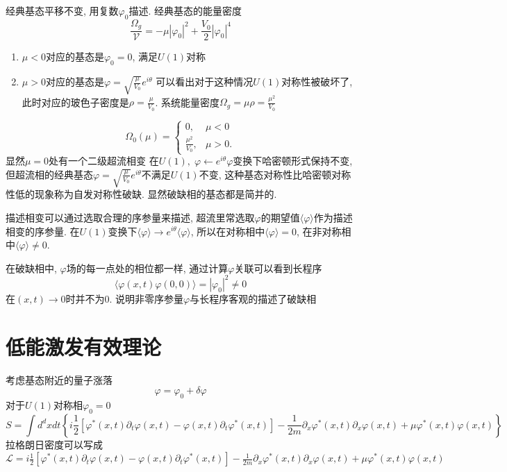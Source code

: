 \documentclass[a4paper,11pt]{article}
\begin{document}
经典基态平移不变, 用复数$\varphi_0$描述. 经典基态的能量密度
\begin{equation*}
  \frac{\Omega_g}{\mathcal{V}}=-\mu|\varphi_0|^2+\frac{V_0}{2}|\varphi_0|^4
\end{equation*}
\begin{enumerate}
  \item $\mu<0$对应的基态是$\varphi_0=0$, 满足$U(1)$对称
  \item $\mu>0$对应的基态是$\varphi=\sqrt{\frac{\mu}{V_0}}e^{i\theta}$
  可以看出对于这种情况$U(1)$对称性被破坏了, 此时对应的玻色子密度是$\rho=\frac{\mu}{V_0}$. 系统能量密度$\Omega_g=\mu\rho=\frac{\mu^2}{V_0}$
\end{enumerate}
\begin{equation*}
  \Omega_0(\mu)=\begin{cases}
                  0, & \mu<0 \\
                  \frac{\mu^2}{V_0}, & \mu>0.
                \end{cases}
\end{equation*}
显然$\mu=0$处有一个二级超流相变
在$U(1),\;\varphi\leftarrow e^{i\theta}\varphi$变换下哈密顿形式保持不变, 但超流相的经典基态$\varphi=\sqrt{\frac{\mu}{V_0}}e^{i\theta}$不满足$U(1)$不变, 这种基态对称性比哈密顿对称性低的现象称为自发对称性破缺. 显然破缺相的基态都是简并的.

描述相变可以通过选取合理的序参量来描述, 超流里常选取$\varphi$的期望值$\langle\varphi\rangle$作为描述相变的序参量. 在$U(1)$变换下$\langle\varphi\rangle\rightarrow e^{i\theta}\langle\varphi\rangle$, 所以在对称相中$\langle\varphi\rangle=0$, 在非对称相中$\langle\varphi\rangle\neq0$.

在破缺相中, $\varphi$场的每一点处的相位都一样, 通过计算$\varphi$关联可以看到长程序
\begin{equation*}
  \langle\varphi(x,t)\varphi(0,0)\rangle=|\varphi_0|^2\neq0
\end{equation*}
在$(x,t)\to0$时并不为$0$. 说明非零序参量$\varphi$与长程序客观的描述了破缺相
\section{低能激发有效理论}
考虑基态附近的量子涨落
\begin{equation*}
  \varphi=\varphi_0+\delta\varphi
\end{equation*}
对于$U(1)$对称相$\varphi_0=0$
\begin{equation*}
  S=\int d^dxdt\left\{i\frac{1}{2}[\varphi^*(x,t)\partial_t\varphi(x,t)-\varphi(x,t)\partial_t\varphi^*(x,t)]-\frac{1}{2m}\partial_x\varphi^*(x,t)\partial_x\varphi(x,t)+\mu\varphi^*(x,t)\varphi(x,t)\right\}
\end{equation*}
拉格朗日密度可以写成$\mathcal{L}=i\frac{1}{2}[\varphi^*(x,t)\partial_t\varphi(x,t)-\varphi(x,t)\partial_t\varphi^*(x,t)]-\frac{1}{2m}\partial_x\varphi^*(x,t)\partial_x\varphi(x,t)+\mu\varphi^*(x,t)\varphi(x,t)$
\end{document}
